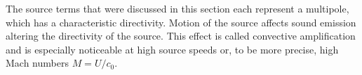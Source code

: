 The source terms that were discussed in this section each represent a multipole,
which has a characteristic directivity. Motion of the source affects sound
emission altering the directivity of the source. This effect is called
convective amplification and is especially noticeable at high source speeds or,
to be more precise, high Mach numbers $M=U/c_0$.

%
%
%
%
%
%
%
%
%
%

